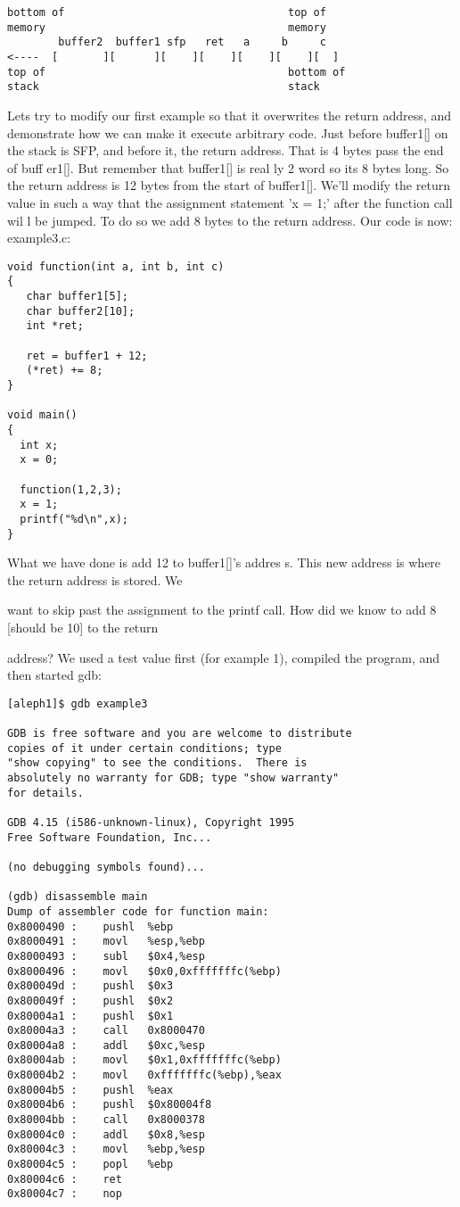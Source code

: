 \documentclass[10pt]{article}
\begin{document}
{\small
\begin{verbatim}
bottom of                                   top of
memory                                      memory
        buffer2  buffer1 sfp   ret   a     b     c
<----  [       ][      ][    ][    ][    ][    ][  ]
top of                                      bottom of
stack                                       stack
\end{verbatim}
}
Lets try to modify our first example so that it overwrites the return address, and demonstrate how we can make 
it execute arbitrary code. Just before buffer1[] on the stack is SFP, and before it, the return address. That is 4 
bytes pass the end of buff er1[]. But remember that buffer1[] is real ly 2 word so its 8 bytes long. So the return 
address is 12 bytes from the start of buffer1[]. We'll modify the return value in such a way that the assignment 
statement 'x = 1;' after the function call wil l be jumped. To do so we add 8 bytes to the return address. 
Our code is now: example3.c:

\begin{lstlisting}
void function(int a, int b, int c) 
{
   char buffer1[5];
   char buffer2[10];
   int *ret;

   ret = buffer1 + 12;
   (*ret) += 8;
}

void main() 
{
  int x;
  x = 0;

  function(1,2,3);
  x = 1;
  printf("%d\n",x);
}
\end{lstlisting}

What we have done is add 12 to buffer1[]'s addres s. This new address is where the return address is stored. We 

want to skip past the assignment to the printf call. How did we know to add 8 [should be 10] to the return 

address? We used a test value first (for example 1), compiled the program, and  then started gdb:

{\small
\begin{verbatim}
[aleph1]$ gdb example3

GDB is free software and you are welcome to distribute 
copies of it under certain conditions; type 
"show copying" to see the conditions.  There is 
absolutely no warranty for GDB; type "show warranty" 
for details.

GDB 4.15 (i586-unknown-linux), Copyright 1995 
Free Software Foundation, Inc...

(no debugging symbols found)...

(gdb) disassemble main
Dump of assembler code for function main:
0x8000490 :    pushl  %ebp
0x8000491 :    movl   %esp,%ebp
0x8000493 :    subl   $0x4,%esp
0x8000496 :    movl   $0x0,0xfffffffc(%ebp)
0x800049d :    pushl  $0x3
0x800049f :    pushl  $0x2
0x80004a1 :    pushl  $0x1
0x80004a3 :    call   0x8000470 
0x80004a8 :    addl   $0xc,%esp
0x80004ab :    movl   $0x1,0xfffffffc(%ebp)
0x80004b2 :    movl   0xfffffffc(%ebp),%eax
0x80004b5 :    pushl  %eax
0x80004b6 :    pushl  $0x80004f8
0x80004bb :    call   0x8000378 
0x80004c0 :    addl   $0x8,%esp
0x80004c3 :    movl   %ebp,%esp
0x80004c5 :    popl   %ebp
0x80004c6 :    ret
0x80004c7 :    nop
\end{verbatim}
}
\end{document}
